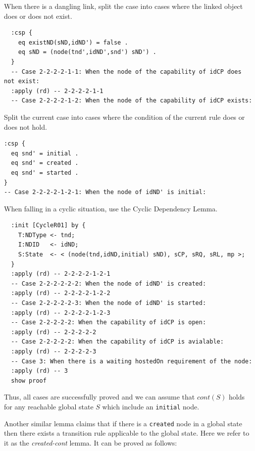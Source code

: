 \documentclass[12pt]{report}
\begin{document}
 When there is a dangling link, split the case
into cases where the linked object does or does not exist.
\small
\begin{verbatim}
  :csp {
    eq existND(sND,idND') = false .
    eq sND = (node(tnd',idND',snd') sND') .
  }
  -- Case 2-2-2-2-1-1: When the node of the capability of idCP does not exist:
  :apply (rd) -- 2-2-2-2-1-1
  -- Case 2-2-2-2-1-2: When the node of the capability of idCP exists:
\end{verbatim}
\normalsize
 Split the current case into cases where
the condition of the current rule does or does not hold.
\small
\begin{verbatim}
:csp {
  eq snd' = initial .
  eq snd' = created .
  eq snd' = started .
}
-- Case 2-2-2-2-1-2-1: When the node of idND' is initial:
\end{verbatim}
\normalsize
 When falling in a cyclic situation, use the
Cyclic Dependency Lemma. 
\small
\begin{verbatim}
  :init [CycleR01] by {
    T:NDType <- tnd;
    I:NDID   <- idND;
    S:State  <- < (node(tnd,idND,initial) sND), sCP, sRQ, sRL, mp >;
  }
  :apply (rd) -- 2-2-2-2-1-2-1
  -- Case 2-2-2-2-2-2: When the node of idND' is created:
  :apply (rd) -- 2-2-2-2-1-2-2
  -- Case 2-2-2-2-2-3: When the node of idND' is started:
  :apply (rd) -- 2-2-2-2-1-2-3
  -- Case 2-2-2-2-2: When the capability of idCP is open:
  :apply (rd) -- 2-2-2-2-2
  -- Case 2-2-2-2-2: When the capability of idCP is avialable:
  :apply (rd) -- 2-2-2-2-3
  -- Case 3: When there is a waiting hostedOn requirement of the node:
  :apply (rd) -- 3
  show proof
\end{verbatim}
\normalsize
Thus, all cases are successfully proved and we can assume that $cont(S)$
holds for any reachable global state $S$ which include an {\tt initial} node.

Another similar lemma claims that if there is a {\tt created} node in
a global state then there exists a transition rule applicable to the
global state. Here we refer to it as the {\it created-cont} lemma. It
can be proved as follows:\\
\end{document}
